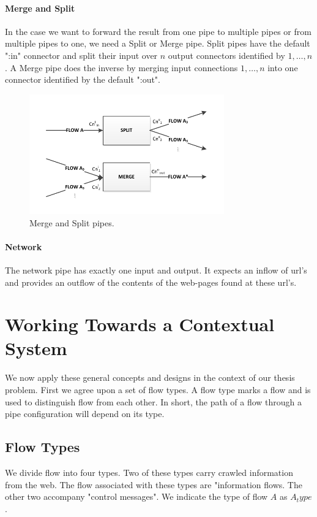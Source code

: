 \paragraph{Merge and Split} In the case we want to forward the result from one pipe to multiple pipes or from multiple pipes to one, we need a Split or Merge pipe. Split pipes have the default ":in" connector and split their input over $n$ output connectors identified by $1,\ldots,n$. A Merge pipe does the inverse by merging input connections $1,\ldots,n$ into one connector identified by the default ":out".

\begin{figure}[htb]
	\centering
		\includegraphics[width=0.75\textwidth]{fig/mergeandsplit}
	\caption{Merge and Split pipes.}
	\label{fig:mergeandsplit}
\end{figure}

\paragraph{Network} The network pipe has exactly one input and output. It expects an inflow of url's and provides an outflow of the contents of the web-pages found at these url's.

\section{Working Towards a Contextual System}

We now apply these general concepts and designs in the context of our thesis problem. First we agree upon a set of flow types. A flow type marks a flow and is used to distinguish flow from each other. In short, the path of a flow through a pipe configuration will depend on its type.

\subsection{Flow Types} We divide flow into four types. Two of these types carry crawled information from the web. The flow associated with these types are "information flows. The other two accompany "control messages". We indicate the type of flow $A$ as $A_type$.

